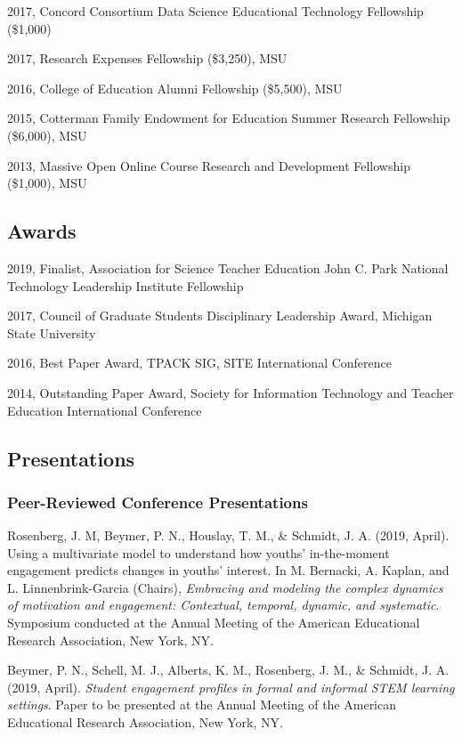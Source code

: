 \documentclass[]{article}
\begin{document}
2017, Concord Consortium Data Science Educational Technology Fellowship
(\$1,000)

2017, Research Expenses Fellowship (\$3,250), MSU

2016, College of Education Alumni Fellowship (\$5,500), MSU

2015, Cotterman Family Endowment for Education Summer Research
Fellowship (\$6,000), MSU

2013, Massive Open Online Course Research and Development Fellowship
(\$1,000), MSU

\subsection{Awards}\label{awards}

2019, Finalist, Association for Science Teacher Education John C. Park
National Technology Leadership Institute Fellowship

2017, Council of Graduate Students Disciplinary Leadership Award,
Michigan State University

2016, Best Paper Award, TPACK SIG, SITE International Conference

2014, Outstanding Paper Award, Society for Information Technology and
Teacher Education International Conference

\subsection{Presentations}\label{presentations}

\subsubsection{Peer-Reviewed Conference
Presentations}\label{peer-reviewed-conference-presentations}

Rosenberg, J. M, Beymer, P. N., Houslay, T. M., \& Schmidt, J. A. (2019,
April). Using a multivariate model to understand how youths'
in-the-moment engagement predicts changes in youths' interest. In M.
Bernacki, A. Kaplan, and L. Linnenbrink-Garcia (Chairs), \emph{Embracing
and modeling the complex dynamics of motivation and engagement:
Contextual, temporal, dynamic, and systematic}. Symposium conducted at
the Annual Meeting of the American Educational Research Association, New
York, NY.

Beymer, P. N., Schell, M. J., Alberts, K. M., Rosenberg, J. M., \&
Schmidt, J. A. (2019, April). \emph{Student engagement profiles in
formal and informal STEM learning settings}. Paper to be presented at
the Annual Meeting of the American Educational Research Association, New
York, NY.
\end{document}
